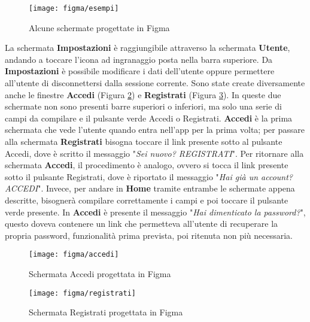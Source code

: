 \begin{figure}[!h]
    \centering 
    \texttt{[image: figma/esempi]} 
    \caption{Alcune schermate progettate in Figma}
    \label{fig:schermatefigma}
\end{figure}
La schermata \textbf{Impostazioni} è raggiungibile attraverso la schermata \textbf{Utente}, andando a toccare l'icona ad ingranaggio posta nella barra superiore.\newline
Da \textbf{Impostazioni} è possibile modificare i dati dell'utente oppure permettere all'utente di disconnettersi dalla sessione corrente.\newline
\newline
Sono state create diversamente anche le finestre \textbf{Accedi} (Figura \ref{fig:accedifigma}) e \textbf{Registrati} (Figura \ref{fig:registratifigma}).\newline
In queste due schermate non sono presenti barre superiori o inferiori, ma solo una serie di campi da compilare e il pulsante verde Accedi o Registrati.\newline
\textbf{Accedi} è la prima schermata che vede l'utente quando entra nell'app per la prima volta; per passare alla schermata \textbf{Registrati} bisogna toccare il link presente sotto al pulsante Accedi, dove è scritto il messaggio "\emph{Sei nuovo? REGISTRATI}".\newline
Per ritornare alla schermata \textbf{Accedi}, il procedimento è analogo, ovvero si tocca il link presente sotto il pulsante Registrati, dove è riportato il messaggio "\emph{Hai già un account? ACCEDI}".\newline
Invece, per andare in \textbf{Home} tramite entrambe le schermate appena descritte, bisognerà compilare correttamente i campi e poi toccare il pulsante verde presente.\newline
\newline
In \textbf{Accedi} è presente il messaggio "\emph{Hai dimenticato la password?}", questo doveva contenere un link che permetteva all'utente di recuperare la propria password, funzionalità prima prevista, poi ritenuta non più necessaria.\newline
\begin{figure}[!h] 
    \centering 
    \texttt{[image: figma/accedi]} 
    \caption{Schermata Accedi progettata in Figma}
    \label{fig:accedifigma}
\end{figure}
\begin{figure}[!h] 
    \centering 
    \texttt{[image: figma/registrati]} 
    \caption{Schermata Registrati progettata in Figma}
    \label{fig:registratifigma}
\end{figure}

